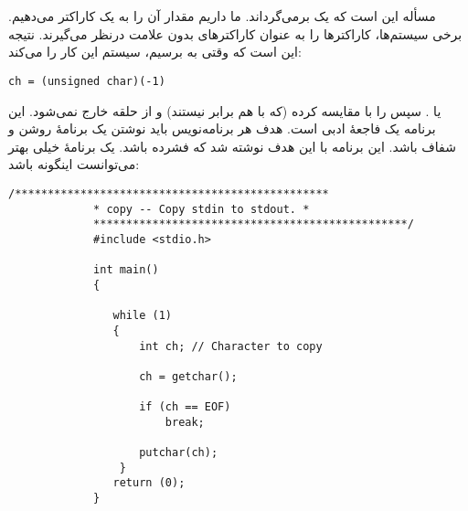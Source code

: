 \section{}
\paragraph{}\label{answer:63}
مسأله این است که  یک  برمی‌گرداند. ما داریم مقدار آن را به یک کاراکتر می‌دهیم. برخی سیستم‌ها، کاراکترها را به عنوان کاراکترهای بدون علامت درنظر می‌گیرند. نتیجه این است که وقتی به  برسیم، سیستم این کار را می‌کند:
\begin{LTR}
        \begin{lstlisting}[style=C++Style]
            ch = (unsigned char)(-1)
        \end{lstlisting}
\end{LTR}

یا . سپس  را با  مقایسه کرده (که با هم برابر نیستند) و از حلقه خارج نمی‌شود. این برنامه یک فاجعهٔ ادبی است. هدف هر برنامه‌نویس  باید نوشتن یک برنامهٔ روشن و شفاف باشد. این برنامه با این هدف نوشته شد که فشرده باشد. یک برنامهٔ خیلی بهتر می‌توانست اینگونه باشد:
\begin{LTR}
        \begin{lstlisting}[style=C++Style]
             /************************************************
             * copy -- Copy stdin to stdout. *
             ************************************************/
             #include <stdio.h>

             int main()
             {

            	while (1)
             	{
             		int ch; // Character to copy

             		ch = getchar();

             		if (ch == EOF)
             			break;

             		putchar(ch);
            	 }
             	return (0);
             }
        \end{lstlisting}
\end{LTR}
